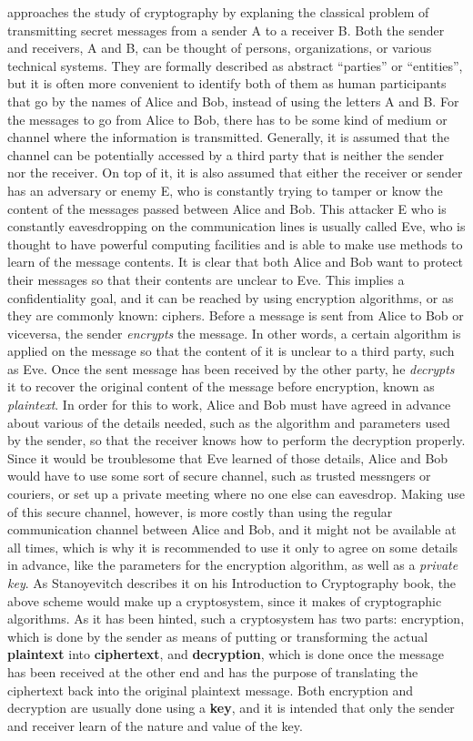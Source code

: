 \cite{CryptoIT} approaches the study of cryptography by explaning the classical problem of transmitting secret messages from a sender A to a receiver B. Both the sender and receivers, A and B, can be thought of persons, organizations, or various technical systems.  They are formally described as abstract ``parties'' or ``entities'', but it is often more convenient to identify both of them as human participants that go by the names of Alice and Bob, instead of using the letters A and B.
For the messages to go from Alice to Bob, there has to be some kind of medium or channel where the information is transmitted. Generally, it is assumed that the channel can be potentially accessed by a third party that is neither the sender nor the receiver. On top of it, it is also assumed that either the receiver or sender has an adversary or enemy E, who is constantly trying to tamper or know the content of the messages passed between Alice and Bob. This attacker E who is constantly eavesdropping on the communication lines is usually called Eve, who is thought to have powerful computing facilities and is able to make use methods to learn of the message contents.  It is clear that both Alice and Bob want to protect their messages so that their contents are unclear to Eve. This implies a confidentiality goal, and it can be reached by using encryption algorithms, or as they are commonly known: ciphers.
Before a message is sent from Alice to Bob or viceversa, the sender \textit{encrypts} the message. In other words, a certain algorithm is applied on the message so that the content of it is unclear to a third party, such as Eve. Once the sent message has been received by the other party, he \textit{decrypts} it to recover the original content of the message before encryption, known as \textit{plaintext}. In order for this to work, Alice and Bob must have agreed in advance about various of the details needed, such as the algorithm and parameters used by the sender, so that the receiver knows how to perform the decryption properly. Since it would be troublesome that Eve learned of those details, Alice and Bob would have to use some sort of secure channel, such as trusted messngers or couriers, or set up a private meeting where no one else can eavesdrop. Making use of this secure channel, however, is more costly than using the regular communication channel between Alice and Bob, and it might not be available at all times, which is why it is recommended to use it only to agree on some details in advance, like the parameters for the encryption algorithm, as well as a \textit{private key}.
As Stanoyevitch \cite{IntroCryptoMath} describes it on his Introduction to Cryptography book, the above scheme would make up a cryptosystem, since it makes of cryptographic algorithms. As it has been hinted, such a cryptosystem has two parts: encryption, which is done by the sender as means of putting or transforming the actual \textbf{plaintext} into \textbf{ciphertext}, and \textbf{decryption}, which is done once the message has been received at the other end and has the purpose of translating the ciphertext back into the original plaintext message. Both encryption and decryption are usually done using a \textbf{key}, and it is intended that only the sender and receiver learn of the nature and value of the key. 

